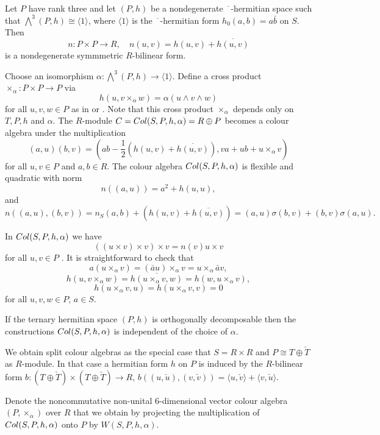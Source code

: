\documentclass[10pt]{amsart}
\theoremstyle{plain}
\theoremstyle{definition}
\newcommand{\can}{\overline{\phantom{x}}}
\newcommand{\ignore}[1]{}
\begin{document}
Let $P$ have rank three and let $(P,h)$ be a nondegenerate $\can$-hermitian space such that $\bigwedge^3 (P,h)
\cong \langle 1\rangle $, where $\langle 1\rangle$ is the $\can$-hermitian form $h_0(a,b)=a\bar b$ on $S$. Then  $$n:P\times P\rightarrow R, \quad n(u,v)=h(u,v)+\overline{h(u,v)}$$
 is a nondegenerate symmmetric $R$-bilinear form.

 Choose an isomorphism $\alpha: \bigwedge^3 (P,h)\rightarrow \langle 1\rangle $.
Define a cross product $\times_{\alpha}:P\times P\rightarrow P$ via
$$h(u,v\times_\alpha w)=\alpha(u\wedge v \wedge w)$$
for all $u,v,w\in P$ as in \cite[p.~5122]{T} or \cite[3.8]{PR}. Note that this cross product
$\times_{\alpha}$ depends only on $T,P,h$ and $\alpha$.
The $R$-module
$C={\rm Col}(S,P,h,\alpha)=R\oplus P$ becomes a colour algebra  under the multiplication
$$(a,u)(b,v)=(ab-\frac{1}{2}(h(u,v)+\overline{h(u,v)}), va+u b+u\times_{\alpha}v)$$
for all $u,v\in P$ and $a,b\in R$.
The colour algebra ${\rm Col}(S,P,h,\alpha)$ is flexible and quadratic  with norm
$$n((a,u))=a^2+h(u,u),$$
and
$$n((a,u),(b,v))=n_S(a,b)+(h(u,v)+\overline{h(u,v)})=(a,u)\sigma(b,v)+(b,v)\sigma(a,u).$$


In  ${\rm Col}(S,P,h,\alpha)$ we have
 $$((u\times v)\times v)\times v=n(v) u\times v$$
for all $u,v\in P$ \cite[Lemma 2]{Pu2}. It is straightforward to check that
$$a(u\times_\alpha v)=(\bar a u)\times_\alpha v= u \times_\alpha \bar a v, $$
$$h(u,v\times_\alpha  w)=\overline{h(u \times_\alpha v,w)}=h(w,u\times_\alpha v),$$
$$h(u\times_\alpha  v,u)=h(u\times_\alpha  v,v)=0$$
for all $u,v,w\in P$, $a\in S$.

If the ternary hermitian space $(P,h)$ is orthogonally decomposable then the constructions ${\rm Col}(S,P,h,\alpha)$ is independent of the choice of $\alpha$.

 We obtain split colour algebras as the special case that $S=R\times R$ and $P\cong T\oplus \check{T}$ as $R$-module. In that case
a hermitian form $h$ on $P$ is induced
by the $R$-bilinear form $b:(T\oplus \check{T})\times (T\oplus \check{T})\rightarrow R$, $b((u,\check{u}), (v,\check{v}))=\langle u,\check{v}\rangle +\langle v,\check{u}\rangle$.

\ignore{ We note that $h(u,v)=\frac{1}{2}(h(u,v)+h(v,u))+\frac{1}{2}(h(v,u)-h(u,v))\in S$ with first term on r.h.s being in $R$, the second part being dropped completely in the multiplication of the colour algebra, first slot.}



Denote the noncommutative non-unital 6-dimensional vector colour algebra $(P,\times_\alpha)$ over $R$ that we obtain by projecting the multiplication of ${\rm Col}(S,P,h,\alpha)$ onto $P$ by $W(S,P,h,\alpha)$.
\end{document}
